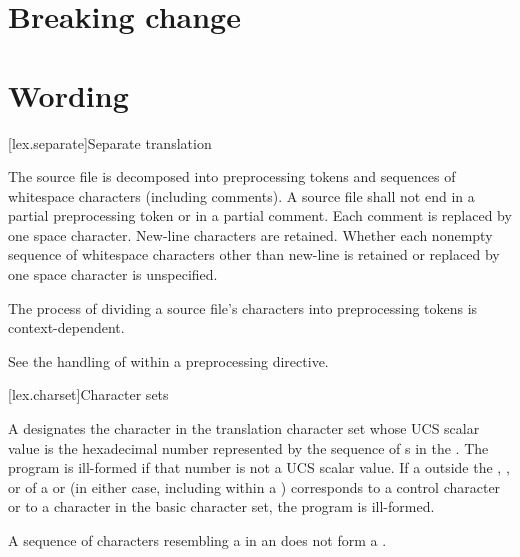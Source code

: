 \documentclass{wg21}
\begin{document}
\section{Breaking change}

\section{Wording}

[lex.separate]{Separate translation}


 The source file is decomposed into preprocessing
tokens and sequences of whitespace characters
(including comments). A source file shall not end in a partial
preprocessing token or in a partial comment.
Each comment is replaced by one space character. New-line characters are
retained. Whether each nonempty sequence of whitespace characters other
than new-line is retained or replaced by one space character is
unspecified.

The process of dividing a source file's
characters into preprocessing tokens is context-dependent.
\begin{example}
    See the handling of \tcode{<} within a  preprocessing
    directive.
\end{example}

[lex.charset]{Character sets}

A 
designates the character in the translation character set
whose UCS scalar value is the hexadecimal number represented by
the sequence of s
in the .
The program is ill-formed if that number is not a UCS scalar value.
If a  outside
the , , or
 of
a  or 
(in either case, including within a )
corresponds to a control character or
to a character in the basic character set, the program is ill-formed.
\begin{note}
    A sequence of characters resembling a  in an
     does not form a
    .
\end{note}
\end{document}
